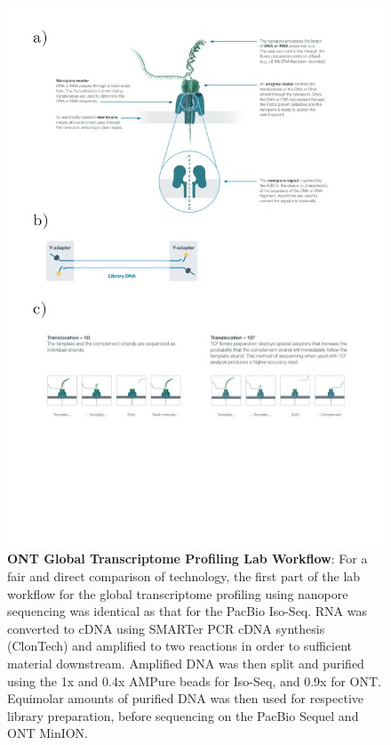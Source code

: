 \begin{figure}[]
	\centering
	\includegraphics[page=4,trim={0 6cm 0 0 },clip, scale = 0.7]{Figures/ProjectDevelopment_FiguresONT}
	\captionsetup{width=0.95\textwidth}
	\caption[ONT Global Transcriptome Profiling Lab Workflow]%
	{\textbf{ONT Global Transcriptome Profiling Lab Workflow}: For a fair and direct comparison of technology, the first part of the lab workflow for the global transcriptome profiling using nanopore sequencing was identical as that for the PacBio Iso-Seq. RNA was converted to cDNA using SMARTer PCR cDNA synthesis (ClonTech) and amplified to two reactions in order to sufficient material downstream. Amplified DNA was then split and purified using the 1x and 0.4x AMPure beads for Iso-Seq, and 0.9x for ONT. Equimolar amounts of purified DNA was then used for respective library preparation, before sequencing on the PacBio Sequel and ONT MinION.}
	\label{fig:ONT_WholeProtocol}
\end{figure}

